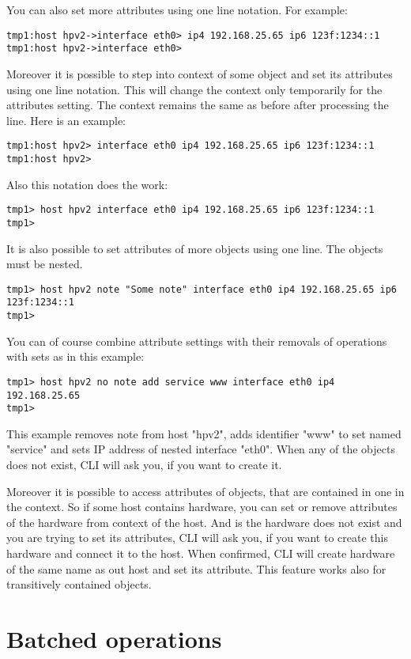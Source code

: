 \documentclass[deska]{subfiles}
\begin{document}
You can also set more attributes using one line notation. For example:
\begin{verbatim}
tmp1:host hpv2->interface eth0> ip4 192.168.25.65 ip6 123f:1234::1 
tmp1:host hpv2->interface eth0>
\end{verbatim}

Moreover it is possible to step into context of some object and set its attributes using one line notation. This will
change the context only temporarily for the attributes setting. The context remains the same as before after processing
the line. Here is an example:
\begin{verbatim}
tmp1:host hpv2> interface eth0 ip4 192.168.25.65 ip6 123f:1234::1 
tmp1:host hpv2>
\end{verbatim}

Also this notation does the work:
\begin{verbatim}
tmp1> host hpv2 interface eth0 ip4 192.168.25.65 ip6 123f:1234::1 
tmp1>
\end{verbatim}

It is also possible to set attributes of more objects using one line. The objects must be nested.
\begin{verbatim}
tmp1> host hpv2 note "Some note" interface eth0 ip4 192.168.25.65 ip6 123f:1234::1 
tmp1>
\end{verbatim}

You can of course combine attribute settings with their removals of operations with sets as in this example:
\begin{verbatim}
tmp1> host hpv2 no note add service www interface eth0 ip4 192.168.25.65 
tmp1>
\end{verbatim}
This example removes note from host "hpv2", adds identifier "www" to set named "service" and sets IP address of nested
interface "eth0". When any of the objects does not exist, CLI will ask you, if you want to create it.

Moreover it is possible to access attributes of objects, that are contained in one in the context. So if some host
contains hardware, you can set or remove attributes of the hardware from context of the host. And is the hardware
does not exist and you are trying to set its attributes, CLI will ask you, if you want to create this hardware and
connect it to the host. When confirmed, CLI will create hardware of the same name as out host and set its attribute.
This feature works also for transitively contained objects.

\section{Batched operations}
\end{document}
